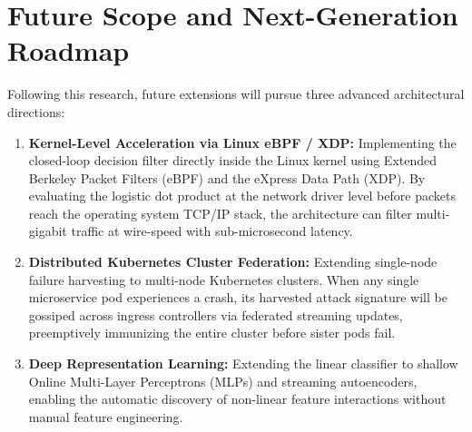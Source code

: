 \documentclass[12pt,a4paper,oneside]{report}
\begin{document}
\section{Future Scope and Next-Generation Roadmap}
Following this research, future extensions will pursue three advanced architectural directions:
\begin{enumerate}
    \item \textbf{Kernel-Level Acceleration via Linux eBPF / XDP:} Implementing the closed-loop decision filter directly inside the Linux kernel using Extended Berkeley Packet Filters (eBPF) and the eXpress Data Path (XDP). By evaluating the logistic dot product at the network driver level before packets reach the operating system TCP/IP stack, the architecture can filter multi-gigabit traffic at wire-speed with sub-microsecond latency.
    \item \textbf{Distributed Kubernetes Cluster Federation:} Extending single-node failure harvesting to multi-node Kubernetes clusters. When any single microservice pod experiences a crash, its harvested attack signature will be gossiped across ingress controllers via federated streaming updates, preemptively immunizing the entire cluster before sister pods fail.
    \item \textbf{Deep Representation Learning:} Extending the linear classifier to shallow Online Multi-Layer Perceptrons (MLPs) and streaming autoencoders, enabling the automatic discovery of non-linear feature interactions without manual feature engineering.
\end{enumerate}
\end{document}
